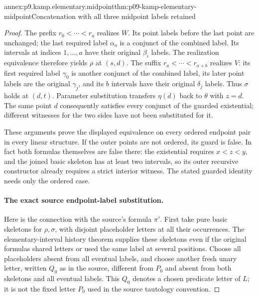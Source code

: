 \begin{annexitem}{annex:p9.kamp.elementary.midpoint}{thm:p09-kamp-elementary-midpoint}{Concatenation with all three midpoint labels retained}
\begin{proof}
The prefix \(r_0<\cdots<r_a\) realizes \(W\). Its point labels
before the last point are unchanged; the last required label
\(\alpha_a\) is a conjunct of the combined label. Its intervals
at indices \(1,\ldots,a\) have their original \(\beta_i\) labels.
The realization equivalence therefore yields \(\rho\) at \((s,d)\).
The suffix \(r_a<\cdots<r_{a+b}\) realizes \(V\): its first
required label \(\gamma_0\) is another conjunct of the combined
label, its later point labels are the original \(\gamma_j\), and
its \(b\) intervals have their original \(\delta_j\) labels.
Thus \(\sigma\) holds at \((d,t)\). Parameter substitution transfers
\(\eta(d)\) back to \(\theta\) with \(z=d\).
The same point \(d\) consequently satisfies every conjunct of the
guarded existential; different witnesses for the two sides have not
been substituted for it.

These arguments prove the displayed equivalence on every ordered
endpoint pair in every linear structure. If the outer points are not
ordered, its guard is false. In fact both formulas themselves are
false there: the existential requires \(x<z<y\), and the joined
basic skeleton has at least two intervals, so its outer recursive
constructor already requires a strict interior witness. The stated
guarded identity needs only the ordered case.

\paragraph{The exact source endpoint-label substitution.}
Here is the connection with the source's formula \(\pi'\).
First take pure basic skeletons for \(\rho,\sigma\), with disjoint
placeholder letters at all their occurrences. The elementary-interval
history theorem supplies these skeletons even if the original formulas
shared letters or used the same label at several positions. Choose all
placeholders absent from all eventual labels, and choose another fresh
unary letter, written \(Q_0\) as in the source, different from \(P_0\)
and absent from both skeletons and all eventual labels. This \(Q_0\) denotes a chosen
predicate letter of \(L\); it is not the fixed letter \(P_0\)
used in the source tautology convention.


\end{proof}
\end{annexitem}
